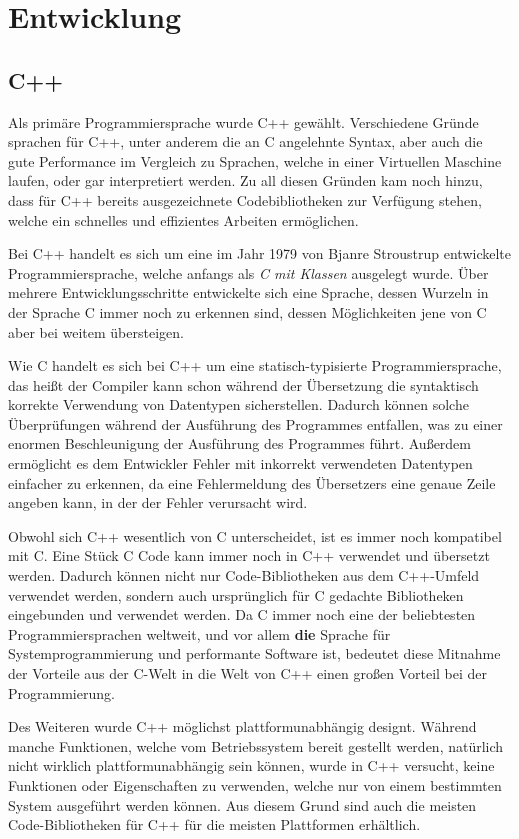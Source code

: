 \chapter{Entwicklung}

\section{C++}
\label{sec:cpp}
Als primäre Programmiersprache wurde C++ gewählt. Verschiedene Gründe sprachen für C++, unter anderem die an C angelehnte Syntax, aber
auch die gute Performance im Vergleich zu Sprachen, welche in einer Virtuellen Maschine laufen, oder gar interpretiert werden. Zu 
all diesen Gründen kam noch hinzu, dass für C++ bereits ausgezeichnete Codebibliotheken zur Verfügung stehen, welche ein schnelles
und effizientes Arbeiten ermöglichen.

Bei C++ handelt es sich um eine im Jahr 1979 von Bjanre Stroustrup entwickelte Programmiersprache, welche anfangs als \textit{C mit Klassen}
ausgelegt wurde. Über mehrere Entwicklungsschritte entwickelte sich eine Sprache, dessen Wurzeln in der Sprache C immer noch zu erkennen sind, 
dessen Möglichkeiten jene von C aber bei weitem übersteigen. 

Wie C handelt es sich bei C++ um eine statisch-typisierte Programmiersprache, das heißt der Compiler kann schon während der Übersetzung die
syntaktisch korrekte Verwendung von Datentypen sicherstellen. Dadurch können solche Überprüfungen während der Ausführung des Programmes
entfallen, was zu einer enormen Beschleunigung der Ausführung des Programmes führt. Außerdem ermöglicht es dem Entwickler Fehler mit
inkorrekt verwendeten Datentypen einfacher zu erkennen, da eine Fehlermeldung des Übersetzers eine genaue Zeile angeben kann, in der 
der Fehler verursacht wird. 

Obwohl sich C++ wesentlich von C unterscheidet, ist es immer noch kompatibel mit C. Eine Stück C Code kann immer noch in C++ verwendet und
übersetzt werden. Dadurch können nicht nur Code-Bibliotheken aus dem C++-Umfeld verwendet werden, sondern auch ursprünglich für C gedachte
Bibliotheken eingebunden und verwendet werden. Da C immer noch eine der beliebtesten Programmiersprachen weltweit, und vor allem \textbf{die}
Sprache für Systemprogrammierung und performante Software ist, bedeutet diese Mitnahme der Vorteile aus der C-Welt in die Welt von C++
einen großen Vorteil bei der Programmierung.

Des Weiteren wurde C++ möglichst plattformunabhängig designt. Während manche Funktionen, welche vom Betriebssystem bereit gestellt werden, 
natürlich nicht wirklich plattformunabhängig sein können, wurde in C++ versucht, keine Funktionen oder Eigenschaften zu verwenden, welche
nur von einem bestimmten System ausgeführt werden können. Aus diesem Grund sind auch die meisten Code-Bibliotheken für C++ für die meisten
Plattformen erhältlich. 

